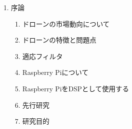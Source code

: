 \documentclass[
  9pt
]{jsarticle}
\author{}
\date{}
\providecommand{\tightlist}{%
  \setlength{\itemsep}{0pt}\setlength{\parskip}{0pt}}
\begin{document}
\begin{enumerate}
\def\labelenumi{\arabic{enumi}.}
\tightlist
\item
  序論

  \begin{enumerate}
  \def\labelenumii{\arabic{enumii}.}
  \tightlist
  \item
    ドローンの市場動向について
  \item
    ドローンの特徴と問題点
  \item
    適応フィルタ
  \item
    Raspberry Piについて
  \item
    Raspberry PiをDSPとして使用する
  \item
    先行研究
  \item
    研究目的
  \end{enumerate}
\end{enumerate}
\end{document}
